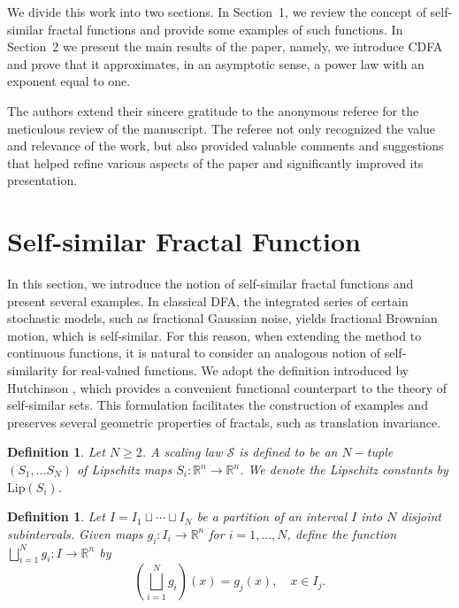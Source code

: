 \documentclass{amsart}
\newtheorem{definition}[theorem]{Definition}
\newcommand{\R}{{\mathbb{R}}}
\begin{document}
We divide this work into two sections. In  Section~1, we review the concept of self-similar fractal functions and provide some examples of such functions. In Section~2 we present the main results of the paper,  namely, we introduce CDFA and prove that it approximates, in an asymptotic sense, a power law with an exponent equal to one.

The authors extend their sincere gratitude to the anonymous referee for the meticulous review of the manuscript. The referee not only recognized the value and relevance of the work, but also provided valuable comments and suggestions that helped refine various aspects of the paper and significantly improved its presentation.

\section{Self-similar Fractal Function}
In this section, we introduce the notion of self-similar fractal functions and present several examples. In classical DFA, the integrated series of certain stochastic models, such as fractional Gaussian noise,  yields fractional Brownian motion, which is self‑similar. For this reason, when extending the method to continuous functions, it is natural to consider an analogous notion of self-similarity for real-valued functions. We adopt the definition introduced by Hutchinson \cite{Hut, Hut2}, which provides a convenient functional counterpart to the theory of self-similar sets. This formulation facilitates the construction of examples and preserves several geometric properties of fractals, such as translation invariance.
    

\begin{definition} Let $N\geq 2$. 
A scaling law $\mathcal{S}$ is defined to be an $N-$tuple $(S_1,\dots S_N)$ of Lipschitz maps $S_i:\R^n\rightarrow \R^n$. We denote the Lipschitz constants by $\mathrm{Lip}(S_i)$.
\end{definition}

\begin{definition}
Let $I=I_1\sqcup \cdots\sqcup I_N$ be a partition of an interval $I$ into $N$ disjoint subintervals.  Given maps $g_i:I_i\rightarrow \R^n$ for $i=1,\dots , N$,  define the function $\bigsqcup^{N}_{i=1} g_i:I\rightarrow \R^n$ by
\begin{equation*}
    \left(\bigsqcup^{N}_{i=1} g_i\right)(x)=g_j(x),\quad x\in I_j.
\end{equation*}
\end{definition}
\end{document}
